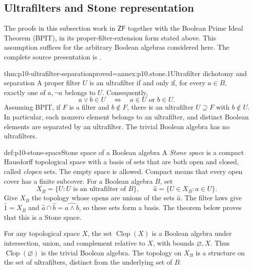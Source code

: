 
\subsection{Ultrafilters and Stone representation}
\label{sec:p10-stone-representation}

The proofs in this subsection work in \(\mathsf{ZF}\) together with
the Boolean Prime Ideal Theorem (BPIT), in its proper-filter-extension
form stated above. This assumption suffices for the arbitrary Boolean
algebras considered here. The complete source presentation is
\cite[IV\S\S3--4]{BurrisSankappanavar2012}.

\begin{hblemma}{thm:p10-ultrafilter-separation}{proved=annex:p10.stone.1}{Ultrafilter dichotomy and separation}
A proper filter \(U\) is an ultrafilter if and only if, for every
\(a\in B\), exactly one of \(a,\neg a\) belongs to \(U\).
Consequently,
\[
 a\vee b\in U\quad\Longleftrightarrow\quad a\in U\text{ or }b\in U.
\]
Assuming BPIT, if \(F\) is a filter and \(b\notin F\), there is an
ultrafilter \(U\supseteq F\) with \(b\notin U\).
In particular, each nonzero element belongs to an ultrafilter,
and distinct Boolean elements are separated by an ultrafilter.
The trivial Boolean algebra has no ultrafilters.
\end{hblemma}

\begin{hbdefinition}{def:p10-stone-space}{Stone space of a Boolean algebra}
A \emph{Stone space} is a compact Hausdorff topological space with
a basis of sets that are both open and closed, called \emph{clopen}
sets. The empty space is allowed.
Compact means that every open cover has a finite subcover.
For a Boolean algebra \(B\), set
\[
 X_B=\{U:U\text{ is an ultrafilter of }B\},\qquad
 \widehat a=\{U\in X_B:a\in U\}.
\]
Give \(X_B\) the topology whose opens are unions of the sets
\(\widehat a\).
The filter laws give
\(\widehat1=X_B\) and
\(\widehat a\cap\widehat b=\widehat{a\wedge b}\), so these sets
form a basis.
The theorem below proves that this is a Stone space.

For any topological space \(X\), the set
\(\operatorname{Clop}(X)\) is a Boolean algebra under intersection,
union, and complement relative to \(X\), with bounds
\(\varnothing,X\).
Thus \(\operatorname{Clop}(\varnothing)\) is the trivial Boolean
algebra. The topology on \(X_B\) is a structure on the set of
ultrafilters, distinct from the underlying set of \(B\).
\end{hbdefinition}


